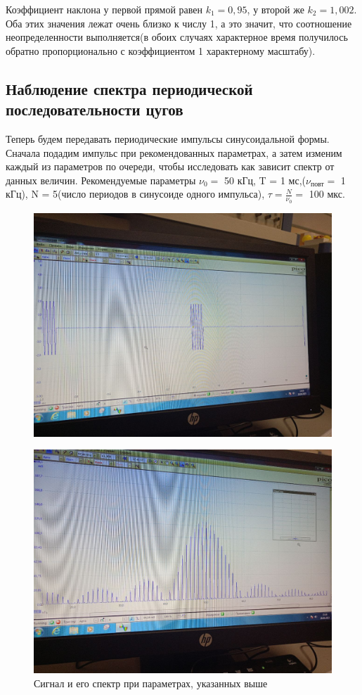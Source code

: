 \documentclass[a4paper,12pt]{article}
\begin{document}
Коэффициент наклона у первой прямой равен $k_1 = 0,95$, у второй же $k_2 = 1,002$. Оба этих значения лежат очень близко к числу 1, а это значит, что соотношение неопределенности выполняется(в обоих случаях характерное время получилось обратно пропорционально с коэффициентом 1 характерному масштабу).

\subsection*{Наблюдение спектра периодической последовательности цугов}

Теперь будем передавать периодические импульсы синусоидальной формы. Сначала подадим импульс при рекомендованных параметрах, а затем изменим каждый из параметров по очереди, чтобы исследовать как зависит спектр от данных величин. Рекомендуемые параметры $\nu_0 =$ 50 кГц, T = 1 мс,($\nu_{\text{повт}} = $ 1 кГц), N = 5(число периодов в синусоиде одного импульса), $\tau = \frac{N}{\nu_0} = $ 100 мкс.
\newpage
\begin{figure}[H]
\begin{center}
    \includegraphics[width=.6\textwidth]{B.13.1.graph}
\end{center}
\end{figure}

\begin{figure}[H]
    \includegraphics[width=.9\textwidth]{B.13.1.spectr}
    \caption{Сигнал и его спектр при параметрах, указанных выше}\label{fig:foobar}
\end{figure}
\end{document}
